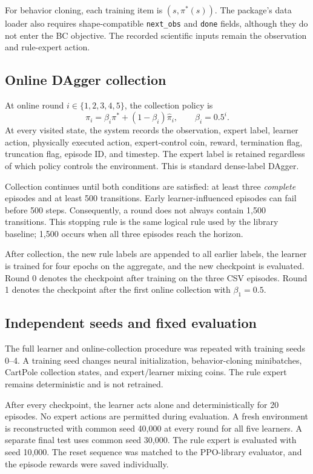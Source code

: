 \documentclass[11pt]{article}
\begin{document}
For behavior cloning, each training item is $(s,\pi^*(s))$. The package's data loader also requires shape-compatible \texttt{next\_obs} and \texttt{done} fields, although they do not enter the BC objective. The recorded scientific inputs remain the observation and rule-expert action.

\subsection{Online DAgger collection}

At online round $i\in\{1,2,3,4,5\}$, the collection policy is
\[
\pi_i=\beta_i\pi^*+(1-\beta_i)\hat\pi_i,
\qquad \beta_i=0.5^i.
\]
At every visited state, the system records the observation, expert label, learner action, physically executed action, expert-control coin, reward, termination flag, truncation flag, episode ID, and timestep. The expert label is retained regardless of which policy controls the environment. This is standard dense-label DAgger.

Collection continues until both conditions are satisfied: at least three \emph{complete} episodes and at least 500 transitions. Early learner-influenced episodes can fail before 500 steps. Consequently, a round does not always contain 1,500 transitions. This stopping rule is the same logical rule used by the library baseline; 1,500 occurs when all three episodes reach the horizon.

After collection, the new rule labels are appended to all earlier labels, the learner is trained for four epochs on the aggregate, and the new checkpoint is evaluated. Round 0 denotes the checkpoint after training on the three CSV episodes. Round 1 denotes the checkpoint after the first online collection with $\beta_1=0.5$.

\subsection{Independent seeds and fixed evaluation}

The full learner and online-collection procedure was repeated with training seeds 0--4. A training seed changes neural initialization, behavior-cloning minibatches, CartPole collection states, and expert/learner mixing coins. The rule expert remains deterministic and is not retrained.

After every checkpoint, the learner acts alone and deterministically for 20 episodes. No expert actions are permitted during evaluation. A fresh environment is reconstructed with common seed 40,000 at every round for all five learners. A separate final test uses common seed 30,000. The rule expert is evaluated with seed 10,000. The reset sequence was matched to the PPO-library evaluator, and the episode rewards were saved individually.
\end{document}
